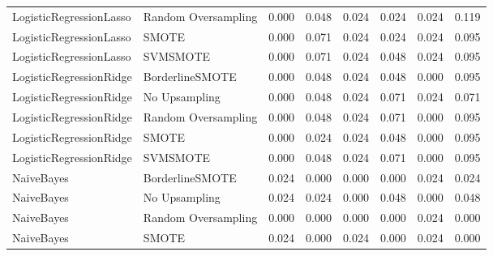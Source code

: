 \begin{tabular}{llllllll}
     LogisticRegressionLasso & Random Oversampling & 0.000 &                     0.048 &                 0.024 &                  0.024 &                                   0.024 &     0.119 \\
     LogisticRegressionLasso &               SMOTE & 0.000 &                     0.071 &                 0.024 &                  0.024 &                                   0.024 &     0.095 \\
     LogisticRegressionLasso &            SVMSMOTE & 0.000 &                     0.071 &                 0.024 &                  0.048 &                                   0.024 &     0.095 \\
     LogisticRegressionRidge &     BorderlineSMOTE & 0.000 &                     0.048 &                 0.024 &                  0.048 &                                   0.000 &     0.095 \\
     LogisticRegressionRidge &       No Upsampling & 0.000 &                     0.048 &                 0.024 &                  0.071 &                                   0.024 &     0.071 \\
     LogisticRegressionRidge & Random Oversampling & 0.000 &                     0.048 &                 0.024 &                  0.071 &                                   0.000 &     0.095 \\
     LogisticRegressionRidge &               SMOTE & 0.000 &                     0.024 &                 0.024 &                  0.048 &                                   0.000 &     0.095 \\
     LogisticRegressionRidge &            SVMSMOTE & 0.000 &                     0.048 &                 0.024 &                  0.071 &                                   0.000 &     0.095 \\
                  NaiveBayes &     BorderlineSMOTE & 0.024 &                     0.000 &                 0.000 &                  0.000 &                                   0.024 &     0.024 \\
                  NaiveBayes &       No Upsampling & 0.024 &                     0.024 &                 0.000 &                  0.048 &                                   0.000 &     0.048 \\
                  NaiveBayes & Random Oversampling & 0.000 &                     0.000 &                 0.000 &                  0.000 &                                   0.024 &     0.000 \\
                  NaiveBayes &               SMOTE & 0.024 &                     0.000 &                 0.024 &                  0.000 &                                   0.024 &     0.000 \\

\end{tabular}
